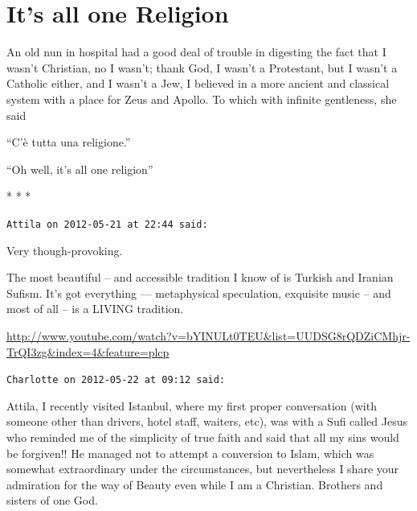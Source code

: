 \section{It’s all one Religion}

\begin{quotex}
An old nun in hospital had a good deal of trouble in digesting the fact that I wasn't Christian, no I wasn't; thank God, I wasn't a Protestant, but I wasn't a Catholic either, and I wasn't a Jew, I believed in a more ancient and classical system with a place for Zeus and Apollo. To which with infinite gentleness, she said 

``C'è tutta una religione.''

``Oh well, it's all one religion''
\end{quotex}




\begin{center}* * *\end{center}

\begin{footnotesize}
\begin{sffamily}
\texttt{Attila on 2012-05-21 at 22:44 said:}

Very though-provoking.

The most beautiful -- and accessible tradition I know of is Turkish and Iranian Sufism. It's got everything --- metaphysical speculation, exquisite music -- and most of all -- is a LIVING tradition.

\url{http://www.youtube.com/watch?v=bYINULt0TEU\&list=UUDSG8rQDZiCMhjr-TrQI3zg\&index=4\&feature=plcp}


\hfill

\texttt{Charlotte on 2012-05-22 at 09:12 said:}

Attila, I recently visited Istanbul, where my first proper conversation (with someone other than drivers, hotel staff, waiters, etc), was with a Sufi called Jesus who reminded me of the simplicity of true faith and said that all my sins would be forgiven!! He managed not to attempt a conversion to Islam, which was somewhat extraordinary under the circumstances, but nevertheless I share your admiration for the way of Beauty even while I am a Christian. Brothers and sisters of one God.


\hfill

\end{sffamily}
\end{footnotesize}

